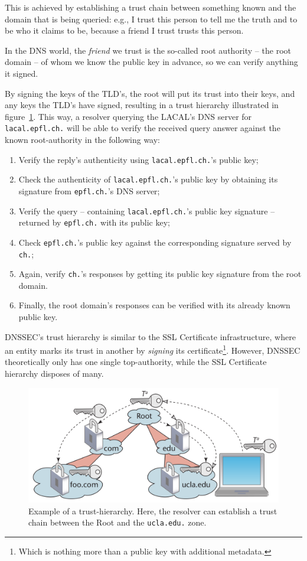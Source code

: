 \documentclass[a4paper,twocolumn]{scrartcl}
\begin{document}
This is achieved by establishing a trust chain between something known and the domain that is being queried: e.g., I trust this person to tell me the truth and to be who it claims to be, because a friend I trust trusts this person.

In the DNS world, the \emph{friend} we trust is the so-called root authority -- the root domain -- of whom we know the public key in advance, so we can verify anything it signed.

By signing the keys of the TLD's, the root will put its trust into their keys, and any keys the TLD's have signed, resulting in a trust hierarchy illustrated in figure~\ref{fig:trust-chain}. This way, a resolver querying the LACAL's DNS server for \verb|lacal.epfl.ch.| will be able to verify the received query answer against the known root-authority in the following way:

\begin{enumerate}
\item Verify the reply's authenticity using \verb|lacal.epfl.ch.|'s
  public key;
\item Check the authenticity of \verb|lacal.epfl.ch.|'s public key by
  obtaining its signature from \verb|epfl.ch.|'s DNS server;
\item Verify the query -- containing \verb|lacal.epfl.ch.|'s public key signature -- returned by \verb|epfl.ch.| with its public key;
\item Check \verb|epfl.ch.|'s public key against the corresponding signature served by \verb|ch.|;
\item Again, verify \verb|ch.|'s responses by getting its public key signature from the root domain.
\item Finally, the root domain's responses can be verified with its already known public key.
\end{enumerate}

DNSSEC's trust hierarchy is similar to the SSL Certificate infrastructure, where an entity marks its trust in another by \emph{signing} its certificate\footnote{Which is nothing more than a public key with additional metadata.}. However, DNSSEC theoretically only has one single top-authority, while the SSL Certificate hierarchy disposes of many.

\begin{figure}
\center
  \includegraphics[width=\linewidth]{trust-chain}
  \caption{Example of a trust-hierarchy. Here, the resolver can establish a trust chain between the Root and the \texttt{ucla.edu.} zone.}
  \label{fig:trust-chain}
\end{figure}
\end{document}
